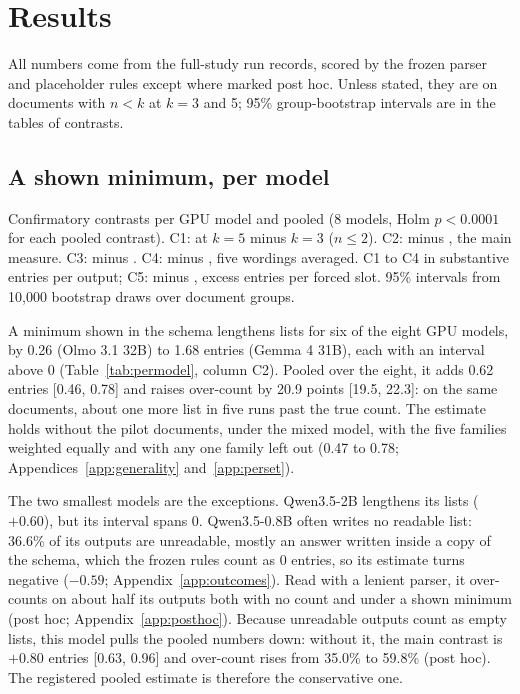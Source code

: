\section{Results}
\label{sec:results}

All numbers come from the full-study run records, scored by the frozen parser and placeholder rules except where marked post hoc.
Unless stated, they are on documents with $n < k$ at $k = 3$ and 5; 95\% group-bootstrap intervals are in the tables of contrasts.

\subsection{A shown minimum, per model}
\label{sec:main}

\begin{table}[t]
  \centering
  \small
  \begin{adjustbox}{max width=\linewidth}\end{adjustbox}
  \caption{Confirmatory contrasts per GPU model and pooled (8 models, Holm $p < 0.0001$ for each pooled contrast). C1:  at $k = 5$ minus $k = 3$ ($n \leq 2$). C2:  minus , the main measure. C3:  minus . C4:  minus , five wordings averaged. C1 to C4 in substantive entries per output; C5:  minus , excess entries per forced slot. 95\% intervals from 10,000 bootstrap draws over document groups.}
  \label{tab:permodel}
\end{table}

A minimum shown in the schema lengthens lists for six of the eight GPU models, by 0.26 (Olmo 3.1 32B) to 1.68 entries (Gemma 4 31B), each with an interval above 0 (Table~\ref{tab:permodel}, column C2).
Pooled over the eight, it adds 0.62 entries [0.46, 0.78] and raises over-count by 20.9 points [19.5, 22.3]: on the same documents, about one more list in five runs past the true count.
The estimate holds without the pilot documents, under the mixed model, with the five families weighted equally and with any one family left out (0.47 to 0.78; Appendices~\ref{app:generality} and~\ref{app:perset}).

The two smallest models are the exceptions.
Qwen3.5-2B lengthens its lists ($+0.60$), but its interval spans 0.
Qwen3.5-0.8B often writes no readable list: 36.6\% of its outputs are unreadable, mostly an answer written inside a copy of the schema, which the frozen rules count as 0 entries, so its estimate turns negative ($-0.59$; Appendix~\ref{app:outcomes}).
Read with a lenient parser, it over-counts on about half its outputs both with no count and under a shown minimum (post hoc; Appendix~\ref{app:posthoc}).
Because unreadable outputs count as empty lists, this model pulls the pooled numbers down: without it, the main contrast is $+0.80$ entries [0.63, 0.96] and over-count rises from 35.0\% to 59.8\% (post hoc).
The registered pooled estimate is therefore the conservative one.

